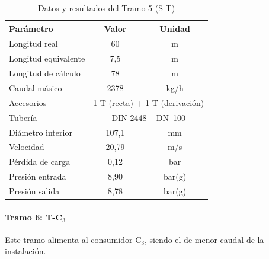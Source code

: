 \begin{table}[H]
	\centering
	\caption{Datos y resultados del Tramo 5 (S-T)}
	\label{tab:tramo5}
	\begin{tabular}{lcc}
		\toprule
		\textbf{Parámetro}   & \textbf{Valor}                                     & \textbf{Unidad} \\
		\midrule
		Longitud real        & 60                                                 & m               \\
		Longitud equivalente & 7{,}5                                              & m               \\
		Longitud de cálculo  & 78                                                 & m               \\
		Caudal másico        & 2378                                               & kg/h            \\
		Accesorios           & \multicolumn{2}{c}{1 T (recta) + 1 T (derivación)}                   \\
		Tubería              & \multicolumn{2}{c}{DIN 2448 -- DN~100}                               \\
		Diámetro interior    & 107{,}1                                            & mm              \\
		Velocidad            & 20{,}79                                            & m/s             \\
		Pérdida de carga     & 0{,}12                                             & bar             \\
		Presión entrada      & 8{,}90                                             & bar(g)          \\
		Presión salida       & 8{,}78                                             & bar(g)          \\
		\bottomrule
	\end{tabular}
\end{table}

\paragraph{Tramo 6: T-C$_3$}

Este tramo alimenta al consumidor C$_3$, siendo el de menor caudal de la instalación.

